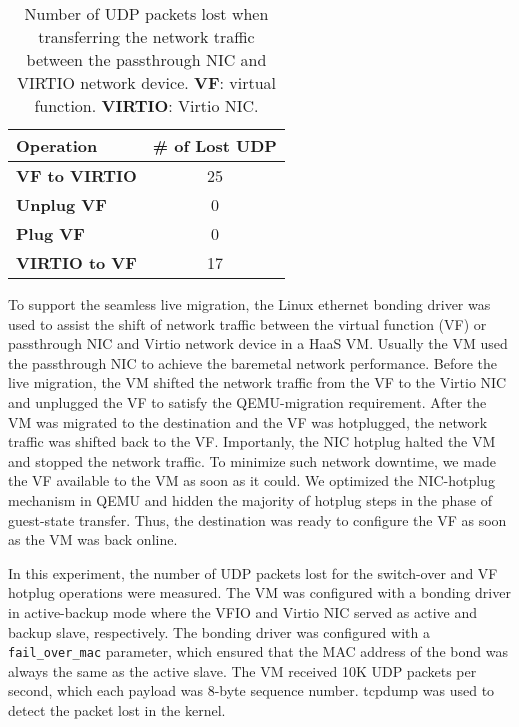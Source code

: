 

\begin{table}[]
\begin{tabular}{|l|c|}
\hline
\textbf{Operation}    & \multicolumn{1}{l|}{\textbf{\# of Lost UDP}} \\ \hline
\textbf{VF to VIRTIO} & 25                                           \\ \hline
\textbf{Unplug VF}    & 0                                            \\ \hline
\textbf{Plug VF}      & 0                                            \\ \hline
\textbf{VIRTIO to VF} & 17                                           \\ \hline
\end{tabular}
\caption{Number of UDP packets lost when transferring the
network traffic between the passthrough NIC and VIRTIO network
device. \textbf{VF}: virtual function. \textbf{VIRTIO}: Virtio
NIC.}
\label{tab:udp_packet_lost}
\end{table}

To support the seamless live migration, the Linux ethernet
bonding driver was used to assist the shift of network traffic
between the virtual function (VF) or passthrough NIC and
Virtio network device in a HaaS VM. Usually the VM used the
passthrough NIC to achieve the baremetal network performance.
Before the live migration, the VM shifted the network traffic
from the VF to the Virtio NIC and unplugged the VF to satisfy
the QEMU-migration requirement. After the VM was migrated to
the destination and the VF was hotplugged, the network traffic
was shifted back to the VF. Importanly, the NIC hotplug halted
the VM and stopped the network traffic. To minimize such
network downtime, we made the VF available to the VM as soon
as it could. We optimized the NIC-hotplug mechanism in QEMU
and hidden the majority of hotplug steps in the phase of
guest-state transfer. Thus, the destination was ready to
configure the VF as soon as the VM was back online.

In this experiment, the number of UDP packets lost for the
switch-over and VF hotplug operations were measured. The VM
was configured with a bonding driver in active-backup mode
where the VFIO and Virtio NIC served as active and backup
slave, respectively. The bonding driver was configured with a
\texttt{fail\_over\_mac} parameter, which ensured that the MAC
address of the bond was always the same as the active slave.
The VM received 10K UDP packets per second, which each payload
was 8-byte sequence number. tcpdump\cite{tcpdump} was used to
detect the packet lost in the kernel.

